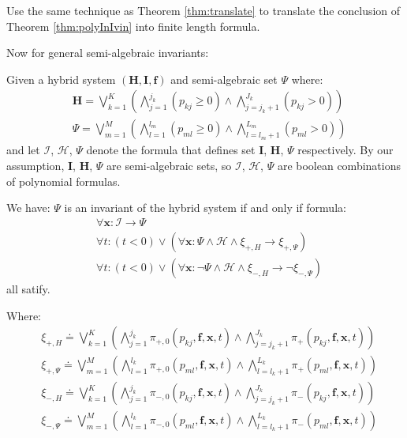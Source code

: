 \documentclass{article}
\begin{document}
\begin{Proof}
Use the same technique as Theorem \ref{thm:translate} to translate the conclusion of Theorem \ref{thm:polyInIvin} into finite length formula.
\end{Proof}

Now for general semi-algebraic invariants:
\begin{Theorem}
\label{thm:semiCond}
Given a hybrid system $(\boldsymbol{H}, \boldsymbol{I}, \boldsymbol{f})$ and semi-algebraic set $\Psi$ where:
\begin{align*}
	&\boldsymbol{H}  = \bigvee_{k=1}^K (\bigwedge_{j=1}^{j_k} (p_{kj} \geq 0) \wedge \bigwedge_{j=j_k+1}^{J_k} (p_{kj} > 0)) \\
	&\Psi = \bigvee_{m=1}^M (\bigwedge_{l=1}^{l_m} (p_{ml} \geq 0) \wedge \bigwedge_{l=l_m+1}^{L_m} (p_{ml} > 0)) 
\end{align*}
and let $\mathcal{I}$, $\mathcal{H}$, $\varPsi$ denote the formula that defines set $\boldsymbol{I}$, $\boldsymbol{H}$, $\Psi$ respectively. By our assumption, $\boldsymbol{I}$, $\boldsymbol{H}$, $\Psi$ are semi-algebraic sets, so $\mathcal{I}$, $\mathcal{H}$, $\varPsi$ are boolean combinations of polynomial formulas.

We have: $\Psi$ is an invariant of the hybrid system if and only if formula:
\begin{align*}
	&\forall \boldsymbol{x} : \mathcal{I} \rightarrow \varPsi \\
	&\forall t : (t < 0) \vee (\forall \boldsymbol{x} : \varPsi \wedge \mathcal{H} \wedge \xi_{+,H} \rightarrow \xi_{+, \Psi}) \\
	&\forall t : (t < 0) \vee (\forall \boldsymbol{x} : \neg \varPsi \wedge \mathcal{H} \wedge \xi_{-,H} \rightarrow \neg \xi_{-, \Psi})
\end{align*}
all satify.

Where:
\begin{align*}
	&\xi_{+, H} \doteq \bigvee_{k=1}^K(\bigwedge_{j=1}^{j_k} \pi_{+, 0}(p_{kj}, \boldsymbol{f}, \boldsymbol{x}, t) \wedge \bigwedge_{j=j_k+1}^{J_k} \pi_+(p_{kj}, \boldsymbol{f}, \boldsymbol{x}, t)) \\
	&\xi_{+, \Psi} \doteq \bigvee_{m=1}^M(\bigwedge_{l=1}^{l_k} \pi_{+, 0}(p_{ml}, \boldsymbol{f}, \boldsymbol{x}, t) \wedge \bigwedge_{l=l_k+1}^{L_k} \pi_+(p_{ml}, \boldsymbol{f}, \boldsymbol{x}, t)) \\
	&\xi_{-, H} \doteq \bigvee_{k=1}^K(\bigwedge_{j=1}^{j_k} \pi_{-, 0}(p_{kj}, \boldsymbol{f}, \boldsymbol{x}, t) \wedge \bigwedge_{j=j_k+1}^{J_k} \pi_-(p_{kj}, \boldsymbol{f}, \boldsymbol{x}, t)) \\
	&\xi_{-, \Psi} \doteq \bigvee_{m=1}^M(\bigwedge_{l=1}^{l_k} \pi_{-, 0}(p_{ml}, \boldsymbol{f}, \boldsymbol{x}, t) \wedge \bigwedge_{l=l_k+1}^{L_k} \pi_-(p_{ml}, \boldsymbol{f}, \boldsymbol{x}, t))
\end{align*}
\end{Theorem}
\end{document}
